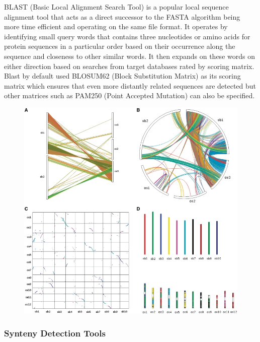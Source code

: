 BLAST (Basic Local Alignment Search Tool) is a popular local sequence alignment tool that acts as a direct successor to the FASTA algorithm being more time efficient and operating on the same file format\cite{pertsemlidis2001having}. It operates by identifying small query words that contains three nucleotides or amino acids for protein sequences in a particular order based on their occurrence along the sequence and closeness to other similar words. It then expands on these words on either direction based on searches from target databases rated by scoring matrix. Blast by default used BLOSUM62 (Block Substitution Matrix) as its scoring matrix which ensures that even more distantly related sequences are detected but other matrices such as PAM250 (Point Accepted Mutation) can also be specified.

\begin{figure}
  \centering
  \includegraphics[width=.75\linewidth]{images/ch_2_synteny_plots.jpg}
  \label{fig:ch_2_synteny_plots}
\end{figure}

\subsubsection{Synteny Detection Tools}


